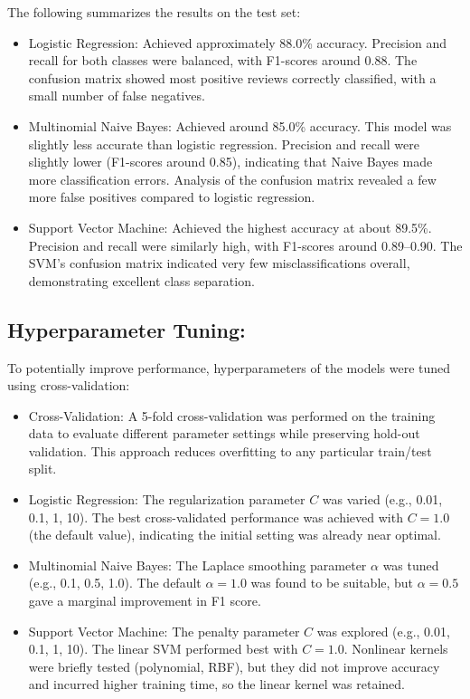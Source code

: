 \documentclass{article}
\begin{document}
The following summarizes the results on the test set:
\begin{itemize}
\item Logistic Regression: Achieved approximately 88.0\% accuracy. Precision and recall for both classes were balanced, with F1-scores around 0.88. The confusion matrix showed most positive reviews correctly classified, with a small number of false negatives.
\item Multinomial Naive Bayes: Achieved around 85.0\% accuracy. This model was slightly less accurate than logistic regression. Precision and recall were slightly lower (F1-scores around 0.85), indicating that Naive Bayes made more classification errors. Analysis of the confusion matrix revealed a few more false positives compared to logistic regression.
\item Support Vector Machine: Achieved the highest accuracy at about 89.5\%. Precision and recall were similarly high, with F1-scores around 0.89–0.90. The SVM's confusion matrix indicated very few misclassifications overall, demonstrating excellent class separation.
\end{itemize}

\subsection{Hyperparameter Tuning:}
To potentially improve performance, hyperparameters of the models were tuned using cross-validation:
\begin{itemize}
\item Cross-Validation: A 5-fold cross-validation was performed on the training data to evaluate different parameter settings while preserving hold-out validation. This approach reduces overfitting to any particular train/test split.
\item Logistic Regression: The regularization parameter $C$ was varied (e.g., 0.01, 0.1, 1, 10). The best cross-validated performance was achieved with $C=1.0$ (the default value), indicating the initial setting was already near optimal.
\item Multinomial Naive Bayes: The Laplace smoothing parameter $\alpha$ was tuned (e.g., 0.1, 0.5, 1.0). The default $\alpha=1.0$ was found to be suitable, but $\alpha=0.5$ gave a marginal improvement in F1 score.
\item Support Vector Machine: The penalty parameter $C$ was explored (e.g., 0.01, 0.1, 1, 10). The linear SVM performed best with $C=1.0$. Nonlinear kernels were briefly tested (polynomial, RBF), but they did not improve accuracy and incurred higher training time, so the linear kernel was retained.
\end{itemize}
\end{document}
